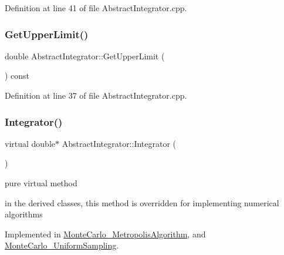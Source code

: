 Definition at line 41 of file Abstract\+Integrator.\+cpp.

\mbox{\label{class_abstract_integrator_a864fe7dc9aa1ff0b36da0b8f361a5b69}} 
\subsubsection{\texorpdfstring{Get\+Upper\+Limit()}{GetUpperLimit()}}
{\footnotesize\ttfamily double Abstract\+Integrator\+::\+Get\+Upper\+Limit (\begin{DoxyParamCaption}{ }\end{DoxyParamCaption}) const}



Definition at line 37 of file Abstract\+Integrator.\+cpp.

\mbox{\label{class_abstract_integrator_a073d8f87239f732b3d2832070caa3b17}} 
\subsubsection{\texorpdfstring{Integrator()}{Integrator()}}
{\footnotesize\ttfamily virtual double$\ast$ Abstract\+Integrator\+::\+Integrator (\begin{DoxyParamCaption}{ }\end{DoxyParamCaption})\hspace{0.3cm}{\ttfamily [pure virtual]}}



pure virtual method 

in the derived classes, this method is overridden for implementing numerical algorithms 

Implemented in \hyperlink{class_monte_carlo___metropolis_algorithm_a93fba72a50330bf184156e23158992b2}{Monte\+Carlo\+\_\+\+Metropolis\+Algorithm}, and \hyperlink{class_monte_carlo___uniform_sampling_a1920387a9f817c8179531fa02f7c00d3}{Monte\+Carlo\+\_\+\+Uniform\+Sampling}.

\mbox{\label{class_abstract_integrator_a9350f10f351d5b58c6aa8e581325ff4f}} 
